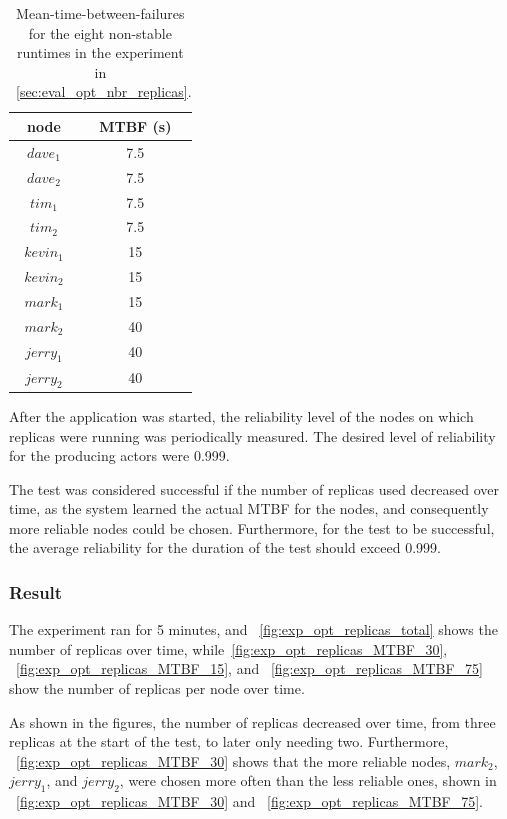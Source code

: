 \documentclass{cslthse-msc}
\begin{document}
\begin{table}[h]
	\begin{center}
	\begin{tabular}{| c  | c |}
	 \hline
	 node & MTBF (s)  \\
	 \hline		
	  $dave_1$ & 7.5 \\
	  $dave_2$ & 7.5 \\
	  $tim_1$ & 7.5 \\
	  $tim_2$ & 7.5 \\
	  $kevin_1$ & 15 \\
	  $kevin_2$ & 15 \\
	  $mark_1$ & 15 \\
	  $mark_2$ & 40 \\
	  $jerry_1$ & 40 \\
	  $jerry_2$ & 40 \\
	   \hline
	\end{tabular}
	 \caption{Mean-time-between-failures for the eight non-stable runtimes in the experiment in ~\cref{sec:eval_opt_nbr_replicas}.}
	 \label{table:exp_nodes_means}
	 \end{center}
 \end{table}


After the application was started, the reliability level of the nodes on which replicas were running was periodically measured. The desired level of reliability for the producing actors were 0.999.

The test was considered successful if the number of replicas used decreased over time, as the system learned the actual MTBF for the nodes, and consequently more reliable nodes could be chosen. Furthermore, for the test to be successful, the average reliability for the duration of the test should exceed 0.999.

\subsubsection*{Result}
The experiment ran for 5 minutes, and ~\cref{fig:exp_opt_replicas_total} shows the number of replicas over time, while~\cref{fig:exp_opt_replicas_MTBF_30}, ~\cref{fig:exp_opt_replicas_MTBF_15}, and ~\cref{fig:exp_opt_replicas_MTBF_75} show the number of replicas per node over time.

As shown in the figures, the number of replicas decreased over time, from three replicas at the start of the test, to later only needing two. Furthermore, ~\cref{fig:exp_opt_replicas_MTBF_30} shows that the more reliable nodes, $mark_2$, $jerry_1$, and $jerry_2$, were chosen more often than the less reliable ones, shown in ~\cref{fig:exp_opt_replicas_MTBF_30} and ~\cref{fig:exp_opt_replicas_MTBF_75}.
\end{document}
